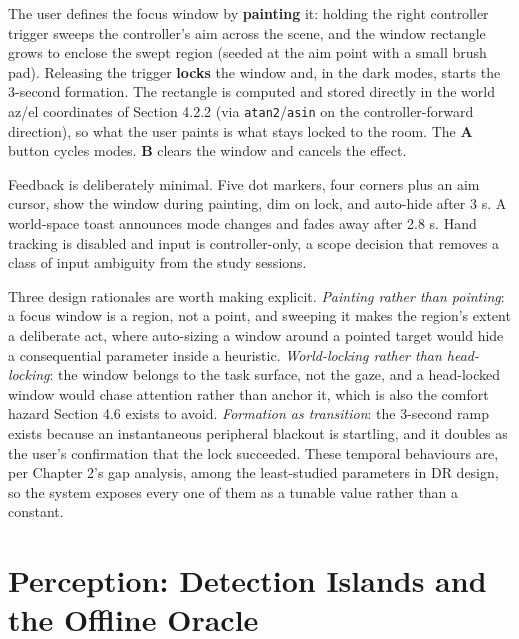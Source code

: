The user defines the focus window by \textbf{painting} it: holding the right controller trigger sweeps
the controller's aim across the scene, and the window rectangle grows to enclose the swept region
(seeded at the aim point with a small brush pad). Releasing the trigger \textbf{locks} the window and, in
the dark modes, starts the 3-second formation. The rectangle is computed and stored directly in the
world az/el coordinates of Section 4.2.2 (via \verb|atan2|/\verb|asin| on the controller-forward direction),
so what the user paints is what stays locked to the room. The \textbf{A} button cycles modes. \textbf{B}
clears the window and cancels the effect.

Feedback is deliberately minimal. Five dot markers, four corners plus an aim cursor, show the window
during painting, dim on lock, and auto-hide after 3 s. A world-space toast announces mode changes and
fades away after 2.8 s. Hand tracking is disabled and input is controller-only, a scope decision that
removes a class of input ambiguity from the study sessions.

Three design rationales are worth making explicit. \textit{Painting rather than pointing}: a focus window
is a region, not a point, and sweeping it makes the region's extent a deliberate act, where
auto-sizing a window around a pointed target would hide a consequential parameter inside a heuristic.
\textit{World-locking rather than head-locking}: the window belongs to the task surface, not the gaze,
and a head-locked window would chase attention rather than anchor it, which is also the comfort
hazard Section 4.6 exists to avoid. \textit{Formation as transition}: the 3-second ramp exists because
an instantaneous peripheral blackout is startling, and it doubles as the user's confirmation that the
lock succeeded. These temporal behaviours are, per Chapter 2's gap analysis, among the least-studied
parameters in DR design, so the system exposes every one of them as a tunable value rather than a
constant.


\section{Perception: Detection Islands and the Offline Oracle}

